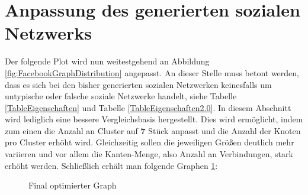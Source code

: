 \section{Anpassung des generierten sozialen Netzwerks}
Der folgende Plot wird nun weitestgehend an Abbildung \ref{fig:FacebookGraphDistribution} angepasst. An dieser Stelle muss betont werden, dass es sich bei den bisher generierten sozialen Netzwerken keinesfalls um untypische oder falsche soziale Netzwerke handelt, siehe Tabelle \ref{TableEigenschaften} und Tabelle \ref{TableEigenschaften2.0}. In diesem Abschnitt wird lediglich eine bessere Vergleichsbasis hergestellt. Dies wird ermöglicht, indem zum einen die Anzahl an Cluster auf \textbf{7} Stück anpasst und die Anzahl der Knoten pro Cluster erhöht wird. Gleichzeitig sollen die jeweiligen Größen deutlich mehr variieren und vor allem die Kanten-Menge, also Anzahl an Verbindungen, stark erhöht werden. Schließlich erhält man folgende Graphen \ref{fig:ourGraphFinalPlot}: 

\FloatBarrier
\begin{figure}[h!]%
  \centering
  \qquad
  \caption{Final optimierter Graph}
  \label{fig:ourGraphFinalPlot}
\end{figure}
\FloatBarrier

